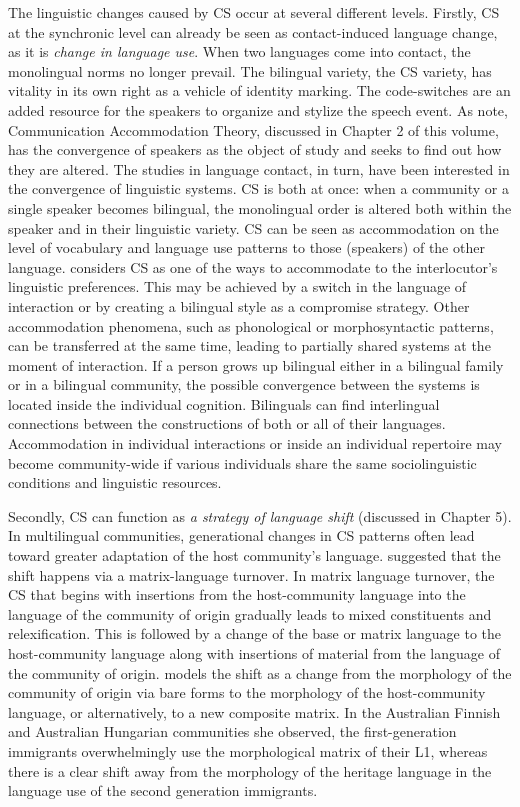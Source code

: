 \documentclass[output=paper,
modfonts
]{langscibook}
\begin{document}
The linguistic changes caused by CS occur at several different levels. Firstly, CS at the synchronic level can already be seen as contact-induced language change, as it is \textit{change in language use}. When two languages come into contact, the monolingual norms no longer prevail. The bilingual variety, the CS variety, has vitality in its own right as a vehicle of identity marking. The code-switches are an added resource for the speakers to organize and stylize the speech event. As  \cite{niedzielski1996linguistic} note, Communication Accommodation Theory, discussed in Chapter 2 of this volume, has the convergence of speakers as the object of study and seeks to find out how they are altered.  The studies in language contact, in turn, have been interested in the convergence of linguistic systems. CS is both at once: when a community or a single speaker becomes bilingual, the monolingual order is altered both within the speaker and in their linguistic variety. CS can be seen as accommodation on the level of vocabulary and language use patterns to those (speakers) of the other language. \cite[pp. 78]{gardner2009code} considers CS as one of the ways to accommodate to the interlocutor’s linguistic preferences. This may be achieved by a switch in the language of interaction or by creating a bilingual style as a compromise strategy. Other accommodation phenomena, such as phonological or morphosyntactic patterns, can be transferred at the same time, leading to partially shared systems at the moment of interaction. If a person grows up bilingual either in a bilingual family or in a bilingual community, the possible convergence between the systems is located inside the individual cognition. Bilinguals can find interlingual connections between the constructions of both or all of their languages. Accommodation in individual interactions or inside an individual repertoire may become community-wide if various individuals share the same sociolinguistic conditions and linguistic resources. 

Secondly, CS can function as \textit{a strategy of language shift} (discussed in Chapter 5). In multilingual communities, generational changes in CS patterns often lead toward greater adaptation of the host community's language. \cite[pp.208--228]{myers1997duelling} suggested that the shift happens via a matrix-language turnover. In matrix language turnover, the CS that begins with insertions from the host-community language into the language of the community of origin gradually leads to mixed constituents and relexification. This is followed by a change of the base or matrix language to the host-community language along with insertions of material from the language of the community of origin. \cite{kovacs2001code} models the shift as a change from the morphology of the community of origin via bare forms to the morphology of the host-community language, or alternatively, to a new composite matrix. In the Australian Finnish and Australian Hungarian communities she observed, the first-generation immigrants overwhelmingly use the morphological matrix of their L1, whereas there is a clear shift away from the morphology of the heritage language in the language use of the second generation immigrants.
\end{document}
